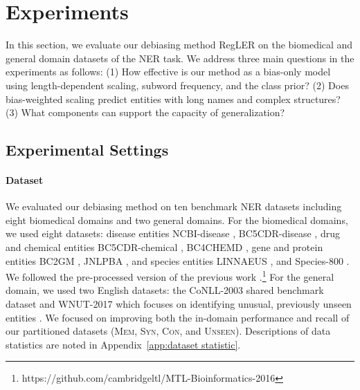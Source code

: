 \documentclass[11pt]{article}
\begin{document}
\section{Experiments}
In this section, we evaluate our debiasing method RegLER on the biomedical and general domain datasets of the NER task.
We address three main questions in the experiments as follows: 
(1) How effective is our method as a bias-only model using length-dependent scaling, subword frequency, and the class prior? (2) Does bias-weighted scaling predict entities with long names and complex structures? (3) What components can support the capacity of generalization?

\subsection{Experimental Settings}

\paragraph{Dataset}
We evaluated our debiasing method on ten benchmark NER datasets including eight biomedical domains and two general domains.
For the biomedical domains, we used eight datasets: disease entities NCBI-disease \cite{dougan2014ncbi}, BC5CDR-disease \cite{li2016biocreative}, drug and chemical entities BC5CDR-chemical \cite{li2016biocreative}, BC4CHEMD \cite{krallinger2015chemdner}, gene and protein entities BC2GM \cite{smith2008overview}, JNLPBA \cite{kim2004introduction}, and species entities LINNAEUS \cite{gerner2010linnaeus}, and Species-800 \cite{pafilis2013species}. 
We followed the pre-processed version of the previous work \cite{crichton2017neural}.\footnote{https://github.com/cambridgeltl/MTL-Bioinformatics-2016}
For the general domain, we used two English datasets: the CoNLL-2003 shared benchmark dataset \cite{sang2003introduction} and WNUT-2017 which focuses on identifying unusual, previously unseen entities \cite{derczynski2017results}.
We focused on improving both the in-domain performance and recall of our partitioned datasets (\textsc{Mem}, \textsc{Syn}, \textsc{Con}, and \textsc{Unseen}).
Descriptions of data statistics are noted in Appendix~\ref{app:dataset statistic}.
\end{document}
